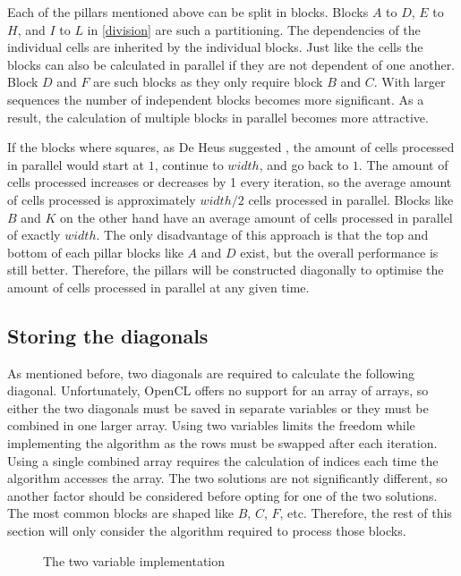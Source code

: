 Each of the pillars mentioned above can be split in blocks.
Blocks $A$ to $D$, $E$ to $H$, and $I$ to $L$ in \cref{division} are such a partitioning.
The dependencies of the individual cells are inherited by the individual blocks.
Just like the cells the blocks can also be calculated in parallel if they are not dependent of one another.
Block $D$ and $F$ are such blocks as they only require block $B$ and $C$.
With larger sequences the number of independent blocks becomes more significant.
As a result, the calculation of multiple blocks in parallel becomes more attractive.

If the blocks where squares, as De Heus suggested \cite{Heus}, the amount of cells processed in parallel would start at $1$, continue to $width$, and go back to $1$.
The amount of cells processed increases or decreases by 1 every iteration, so the average amount of cells processed is approximately $width/2$ cells processed in parallel.
Blocks like $B$ and $K$ on the other hand have an average amount of cells processed in parallel of exactly $width$.
The only disadvantage of this approach is that the top and bottom of each pillar blocks like $A$ and $D$ exist, but the overall performance is still better.
Therefore, the pillars will be constructed diagonally to optimise the amount of cells processed in parallel at any given time.

\subsection{Storing the diagonals} \label{section:diagonal}
As mentioned before, two diagonals are required to calculate the following diagonal.
Unfortunately, OpenCL offers no support for an array of arrays, so either the two diagonals must be saved in separate variables or they must be combined in one larger array.
Using two variables limits the freedom while implementing the algorithm as the rows must be swapped after each iteration.
Using a single combined array requires the calculation of indices each time the algorithm accesses the array.
The two solutions are not significantly different, so another factor should be considered before opting for one of the two solutions.
The most common blocks are shaped like $B$, $C$, $F$, etc.
Therefore, the rest of this section will only consider the algorithm required to process those blocks.

\begin{figure}[p]
    \centering
    \subfloat[][Input]{\label{twovarsinput}}
    \subfloat[][Output]{\label{twovarsoutput}}
    \caption{The two variable implementation} \label{twovars}
\end{figure}

